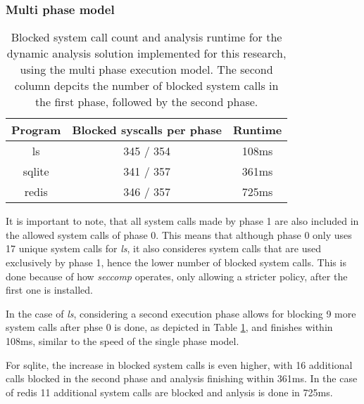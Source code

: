 \subsubsection {Multi phase model}
\begin{table}[!h]
\begin{center}
\caption{Blocked system call count and analysis runtime for the dynamic analysis solution implemented for this research, using the multi phase execution model. The second column depcits the number of blocked system calls in the first phase, followed by the second phase.}
\label{tbl:dyn_mp_results}
\begin{tabular}{||c c c||}
 \hline
Program & Blocked syscalls per phase & Runtime \\
 \hline\hline
 ls & 345 / 354 & 108ms \\
 \hline
 sqlite & 341 / 357 & 361ms \\
 \hline
 redis & 346 / 357 & 725ms \\
 \hline
\end{tabular}
\end{center}
\end{table}
It is important to note, that all system calls made by phase 1 are also included in the allowed system calls of phase 0. This means that although phase 0 only uses 17 unique system calls for \textit{ls}, it also consideres system calls that are used exclusively by phase 1, hence the lower number of blocked system calls.
This is done because of how \textit{seccomp} operates, only allowing a stricter policy, after the first one is installed.

In the case of \textit{ls}, considering a second execution phase allows for blocking 9 more system calls after phse 0 is done, as depicted in Table \ref{tbl:dyn_mp_results}, and finishes within 108ms, similar to the speed of the single phase model.

For sqlite, the increase in blocked system calls is even higher, with 16 additional calls blocked in the second phase and analysis finishing within 361ms.
In the case of redis 11 additional system calls are blocked and anlysis is done in 725ms.

